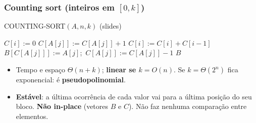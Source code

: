 \subsubsection*{Counting sort (inteiros em $[0,k]$)}
\begin{pseudo}{COUNTING-SORT$(A,n,k)$ (slides)}
\begin{algorithmic}
 \State $C[i]:=0$ \EndFor
{} \State $C[A[j]]:=C[A[j]]+1$ \EndFor {}
 \State $C[i]:=C[i]+C[i-1]$ \EndFor {}
 
  \State $B[C[A[j]]]:=A[j]$;\ $C[A[j]]:=C[A[j]]-1$
\EndFor
\State \Return $B$
\end{algorithmic}
\end{pseudo}
\begin{itemize}
  \item Tempo e espaço $\Theta(n+k)$; \textbf{linear se $k=O(n)$}. Se $k=\Theta(2^n)$ fica exponencial: é \textbf{pseudopolinomial}.
  \item \textbf{Estável}: a última ocorrência de cada valor vai para a última posição do seu bloco. \textbf{Não in-place} (vetores $B$ e $C$). Não faz nenhuma comparação entre elementos.
\end{itemize}

